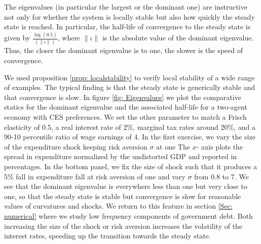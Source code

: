 \documentclass[thmsb,11pt]{article}
\begin{document}
The eigenvalues (in particular the largest or the dominant one) are instructive not only for whether the system is locally stable but also how quickly the steady state is reached. In particular, the half-life of convergence to the steady state is given by $\frac{\log(0.5)}{(\|\iota\|)}$, where $\|\iota\|$ is the absolute value of the dominant eigenvalue.  Thus, the closer the dominant eigenvalue is to one, the slower is the speed of convergence.

We used proposition \ref{prop: localstability} to verify local stability of a wide range of examples. The typical finding is that the steady state is generically stable and that convergence is slow. In figure \ref{fig: Eigenvalues} we plot the comparative statics for the dominant eigenvalue and the associated  half-life for a two-agent economy with CES preferences. %
We set the other parameter to match a Frisch elasticity of 0.5,  a real interest rate of 2\%, marginal tax rates  around 20\%, and a 90-10 percentile ratio of wage earnings of 4. In the first exercise, we vary the size of the expenditure shock keeping risk aversion $\sigma$ at one The $x$- axis plots the spread in expenditure normalized by the undistorted GDP and reported in percentages. In the bottom panel, we fix the size of shock such that it produces a 5\% fall in expenditure fall at risk aversion of one and vary $\sigma$ from 0.8 to 7. We see that the dominant eigenvalue is everywhere less than one but very close to one, so that the steady state is stable but convergence is slow for reasonable values of curvatures and shocks.  We return to this feature in section \ref{Sec: numerical} where we study low frequency components of government debt. Both increasing the size of the shock or risk aversion increases the volatility of the interest rates, speeding up the transition towards the steady state.

%
\end{document}
